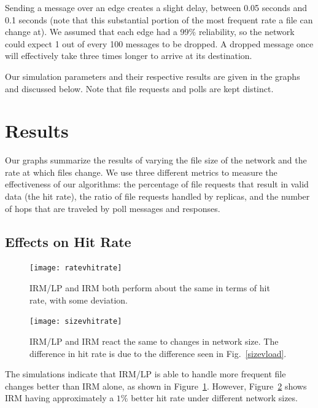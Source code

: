 \documentclass[10pt, conference, compsocconf, letterpaper]{IEEEtran} %
\begin{document}
Sending a message over an edge creates a slight delay, between 0.05 seconds and 0.1 seconds (note that this substantial portion of the most frequent rate a file can change at).  We assumed that each edge had a 99\% reliability, so the network could expect 1 out of every 100 messages to be dropped.  A dropped message once will effectively take three times longer to arrive at its destination.


Our simulation parameters and their respective results are given in the graphs and discussed below. Note that file requests and polls are kept distinct.




\section{Results}


Our graphs summarize the results of varying the file size of the network and the rate at which files change.  We use three different metrics to measure the effectiveness of our algorithms: the percentage of file requests that result in valid data (the hit rate), the ratio of file requests handled by replicas, and the number of hops that are traveled by poll messages and responses.






\subsection{Effects on Hit Rate}

\begin{figure}
\texttt{[image: ratevhitrate]}
\caption{IRM/LP and IRM both perform about the same in terms of hit rate, with some deviation.}
\label{ratevhit}
\end{figure}



\begin{figure}
\texttt{[image: sizevhitrate]}
\caption{IRM/LP and IRM react the same to changes in network size.  The difference in hit rate is due to the difference seen in  Fig.~\ref{sizevload}.}
\label{sizevhit}

\end{figure}



The simulations indicate that IRM/LP is able to handle more frequent file changes better than IRM alone, as shown in Figure~\ref{ratevhit}. %
However, Figure~\ref{sizevhit} shows IRM having approximately a $1\%$ better hit rate under different network sizes.
\end{document}
